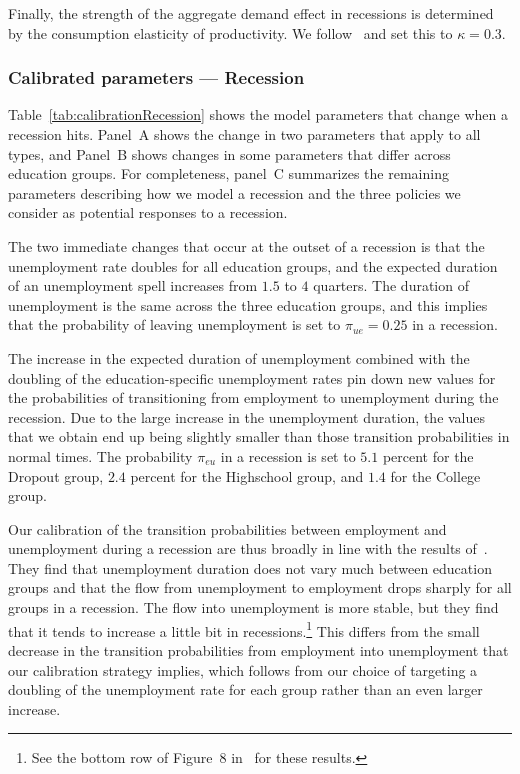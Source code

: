 \documentclass[qe]{econsocart}
\begin{document}
Finally, the strength of the aggregate demand effect in recessions is determined by the consumption elasticity of productivity.
We follow~\cite{kmpHandbook} and set this to $\kappa=0.3$.

\subsubsection{Calibrated parameters --- Recession}
\label{sec:calibRecession}

Table~\ref{tab:calibrationRecession} shows the model parameters that change when a recession hits. Panel~A shows the change in two parameters that apply to all types, and Panel~B shows changes in some parameters that differ across education groups. For completeness, panel~C summarizes the remaining parameters describing how we model a recession and the three policies we consider as potential responses to a recession.

The two immediate changes that occur at the outset of a recession is that the unemployment rate doubles for all education groups, and the expected duration of an unemployment spell increases from $1.5$ to $4$ quarters. The duration of unemployment is the same across the three education groups, and this implies that the probability of leaving unemployment is set to $\pi_{ue} = 0.25$ in a recession.

The increase in the expected duration of unemployment combined with the doubling of the education-specific unemployment rates pin down new values for the probabilities of transitioning from employment to unemployment during the recession. Due to the large increase in the unemployment duration, the values that we obtain end up being slightly smaller than those transition probabilities in normal times. The probability $\pi_{eu}$ in a recession is set to $5.1$ percent for the Dropout group, $2.4$ percent for the Highschool group, and $1.4$ for the College group.

Our calibration of the transition probabilities between employment and unemployment during a recession are thus broadly in line with the results of~\cite{elsby2010labor}. They find that unemployment duration does not vary much between education groups and that the flow from unemployment to employment drops sharply for all groups in a recession. The flow into unemployment is more stable, but they find that it tends to increase a little bit in recessions.\footnote{See the bottom row of Figure~8 in~\cite{elsby2010labor} for these results.} This differs from the small decrease in the transition probabilities from employment into unemployment that our calibration strategy implies, which follows from our choice of targeting a doubling of the unemployment rate for each group rather than an even larger increase.
\end{document}
